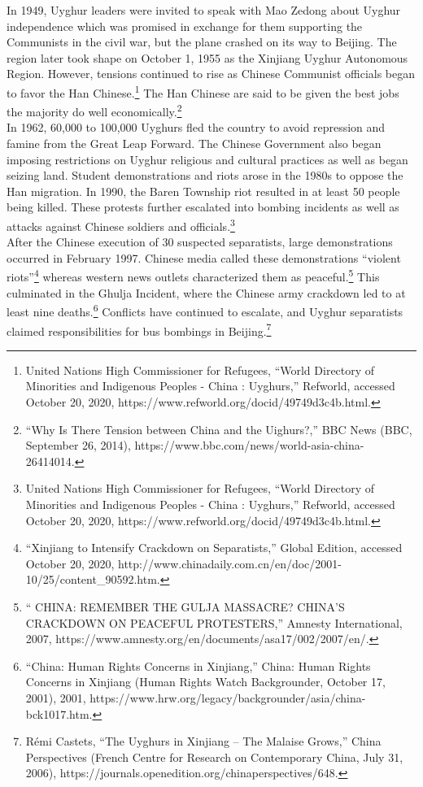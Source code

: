 \documentclass[10pt, letterpaper]{article}
\begin{document}
In 1949, Uyghur leaders were invited to speak with Mao Zedong about
Uyghur independence which was promised in exchange for them supporting
the Communists in the civil war, but the plane crashed on its way to
Beijing. The region later took shape on October 1, 1955 as the Xinjiang
Uyghur Autonomous Region. However, tensions continued to rise as Chinese
Communist officials began to favor the Han Chinese.\footnote{United
  Nations High Commissioner for Refugees, ``World Directory of
  Minorities and Indigenous Peoples - China : Uyghurs,'' Refworld,
  accessed October 20, 2020,
  https://www.refworld.org/docid/49749d3c4b.html.} The Han Chinese are
said to be given the best jobs the majority do well
economically.\footnote{``Why Is There Tension between China and the
  Uighurs?,'' BBC News (BBC, September 26, 2014),
  https://www.bbc.com/news/world-asia-china-26414014.} \\

In 1962, 60,000 to 100,000 Uyghurs fled the country to avoid repression
and famine from the Great Leap Forward. The Chinese Government also
began imposing restrictions on Uyghur religious and cultural practices
as well as began seizing land. Student demonstrations and riots arose in
the 1980s to oppose the Han migration. In 1990, the Baren Township riot
resulted in at least 50 people being killed. These protests further
escalated into bombing incidents as well as attacks against Chinese
soldiers and officials.\footnote{United Nations High Commissioner for
  Refugees, ``World Directory of Minorities and Indigenous Peoples -
  China : Uyghurs,'' Refworld, accessed October 20, 2020,
  https://www.refworld.org/docid/49749d3c4b.html.} \\

After the Chinese execution of 30 suspected separatists, large
demonstrations occurred in February 1997. Chinese media called these
demonstrations ``violent riots''\footnote{``Xinjiang to Intensify
  Crackdown on Separatists,'' Global Edition, accessed October 20, 2020,
  http://www.chinadaily.com.cn/en/doc/2001-10/25/content\_90592.htm.}
whereas western news outlets characterized them as peaceful.\footnote{``
  CHINA: REMEMBER THE GULJA MASSACRE? CHINA'S CRACKDOWN ON PEACEFUL
  PROTESTERS,'' Amnesty International, 2007,
  https://www.amnesty.org/en/documents/asa17/002/2007/en/.} This
culminated in the Ghulja Incident, where the Chinese army crackdown led
to at least nine deaths.\footnote{``China: Human Rights Concerns in
  Xinjiang,'' China: Human Rights Concerns in Xinjiang (Human Rights
  Watch Backgrounder, October 17, 2001), 2001,
  https://www.hrw.org/legacy/backgrounder/asia/china-bck1017.htm.}
Conflicts have continued to escalate, and Uyghur separatists claimed
responsibilities for bus bombings in Beijing.\footnote{Rémi Castets,
  ``The Uyghurs in Xinjiang -- The Malaise Grows,'' China Perspectives
  (French Centre for Research on Contemporary China, July 31, 2006),
  https://journals.openedition.org/chinaperspectives/648.} \\
\end{document}
